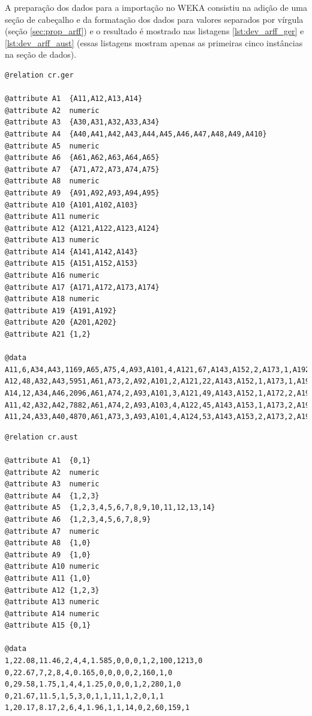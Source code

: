 A preparação dos dados para a importação no WEKA consistiu na adição de uma seção de cabeçalho e da formatação dos dados para valores separados por vírgula (seção \ref{sec:prop_arff}) e o resultado é mostrado nas listagens \ref{lst:dev_arff_ger} e \ref{lst:dev_arff_aust} (essas listagens mostram apenas as primeiras cinco instâncias na seção de dados).

\vspace{0.5cm}
\begin{lstlisting}[caption=Arquivo ARFF do \emph{Cr.Ger}, label=lst:dev_arff_ger]
@relation cr.ger

@attribute A1  {A11,A12,A13,A14}
@attribute A2  numeric
@attribute A3  {A30,A31,A32,A33,A34}
@attribute A4  {A40,A41,A42,A43,A44,A45,A46,A47,A48,A49,A410}
@attribute A5  numeric
@attribute A6  {A61,A62,A63,A64,A65}
@attribute A7  {A71,A72,A73,A74,A75}
@attribute A8  numeric
@attribute A9  {A91,A92,A93,A94,A95}
@attribute A10 {A101,A102,A103}
@attribute A11 numeric
@attribute A12 {A121,A122,A123,A124}
@attribute A13 numeric
@attribute A14 {A141,A142,A143}
@attribute A15 {A151,A152,A153}
@attribute A16 numeric
@attribute A17 {A171,A172,A173,A174}
@attribute A18 numeric
@attribute A19 {A191,A192}
@attribute A20 {A201,A202}
@attribute A21 {1,2}

@data
A11,6,A34,A43,1169,A65,A75,4,A93,A101,4,A121,67,A143,A152,2,A173,1,A192,A201,1
A12,48,A32,A43,5951,A61,A73,2,A92,A101,2,A121,22,A143,A152,1,A173,1,A191,A201,2
A14,12,A34,A46,2096,A61,A74,2,A93,A101,3,A121,49,A143,A152,1,A172,2,A191,A201,1
A11,42,A32,A42,7882,A61,A74,2,A93,A103,4,A122,45,A143,A153,1,A173,2,A191,A201,1
A11,24,A33,A40,4870,A61,A73,3,A93,A101,4,A124,53,A143,A153,2,A173,2,A191,A201,2
\end{lstlisting}
\vspace{0.5cm}

\vspace{0.5cm}
\begin{lstlisting}[caption=Arquivo ARFF do \emph{Cr.Aust}, label=lst:dev_arff_aust]
@relation cr.aust

@attribute A1  {0,1}
@attribute A2  numeric
@attribute A3  numeric
@attribute A4  {1,2,3}
@attribute A5  {1,2,3,4,5,6,7,8,9,10,11,12,13,14}
@attribute A6  {1,2,3,4,5,6,7,8,9}
@attribute A7  numeric
@attribute A8  {1,0}
@attribute A9  {1,0}
@attribute A10 numeric
@attribute A11 {1,0}
@attribute A12 {1,2,3}
@attribute A13 numeric
@attribute A14 numeric
@attribute A15 {0,1}

@data
1,22.08,11.46,2,4,4,1.585,0,0,0,1,2,100,1213,0
0,22.67,7,2,8,4,0.165,0,0,0,0,2,160,1,0
0,29.58,1.75,1,4,4,1.25,0,0,0,1,2,280,1,0
0,21.67,11.5,1,5,3,0,1,1,11,1,2,0,1,1
1,20.17,8.17,2,6,4,1.96,1,1,14,0,2,60,159,1
\end{lstlisting}
\vspace{0.5cm}

